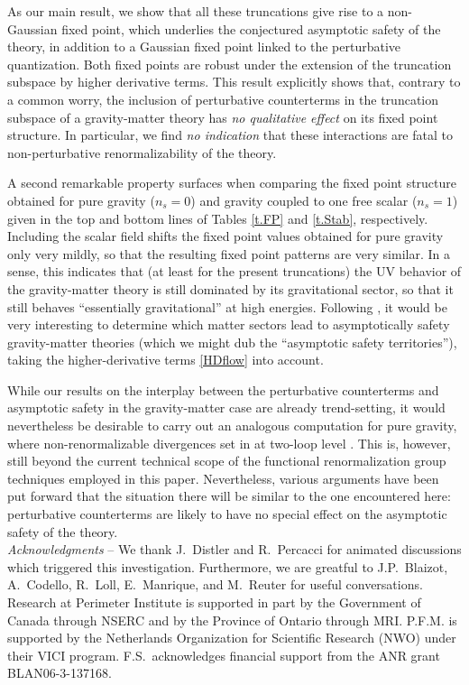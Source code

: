 \documentclass[preprint,preprintnumbers,amsmath,amssymb,nofootinbib,APS]{revtex4}
\newcommand{\2}{\sqrt{2\,}}
\begin{document}
As our main result, we show that all these truncations give rise to a non-Gaussian fixed point, which underlies the conjectured asymptotic safety of the theory, in addition to a Gaussian fixed point linked to the perturbative quantization. Both fixed points are robust under the extension of the truncation subspace by higher derivative terms. This result explicitly shows that, contrary to a common worry, the inclusion of perturbative counterterms in the truncation subspace of a gravity-matter theory has {\it no qualitative effect} on its fixed point structure. In particular, we find {\it no indication} that these interactions are fatal to non-perturbative renormalizability of the theory. 

A second remarkable property surfaces when comparing the fixed point structure obtained for pure gravity ($n_s = 0$) and gravity coupled to one free scalar ($n_s = 1$) given in the top and bottom lines of Tables \ref{t.FP} and \ref{t.Stab}, respectively. Including the scalar field shifts the fixed point values obtained for pure gravity only very mildly, so that the resulting fixed point patterns are very similar. In a sense, this indicates that (at least for the present truncations) the UV behavior of the gravity-matter theory is still dominated by its gravitational sector, so that it still behaves ``essentially gravitational'' at high energies. 
Following \cite{Percacci:2002ie,Gies:2009hq}, it would be very interesting to determine which matter sectors lead to asymptotically safety 
gravity-matter theories (which we might dub the ``asymptotic safety territories''), 
taking the higher-derivative terms \eqref{HDflow} into account.


While our results on the interplay between the perturbative counterterms and asymptotic safety in the gravity-matter case are already trend-setting, it would nevertheless be desirable to carry out an analogous computation for pure gravity, where non-renormalizable divergences set in at two-loop level \cite{Goroff:1985sz,vandeVen:1991gw}. This is, however, still beyond the current technical scope of the  functional renormalization group techniques employed in this paper. Nevertheless, various arguments have been put forward \cite{Codello:2008vh,Reuter:2008qx} that the situation there will be similar to the one encountered here: perturbative counterterms are likely to have no special effect on the asymptotic safety of the theory. \\[3ex]


\noindent
{\it Acknowledgments} -- 
We thank J.\ Distler and R.\ Percacci for animated discussions which triggered this investigation. Furthermore, we are greatful to J.P.\ Blaizot, A.\ Codello, R.\ Loll, E.\ Manrique, and M.\ Reuter for useful conversations. Research at Perimeter Institute is supported in part by the Government of Canada through NSERC and by the Province of Ontario through MRI. P.F.M. is supported by the Netherlands Organization for Scientific Research (NWO) under their VICI program. F.S.\ acknowledges 
financial support from the ANR grant BLAN06-3-137168.
\end{document}
